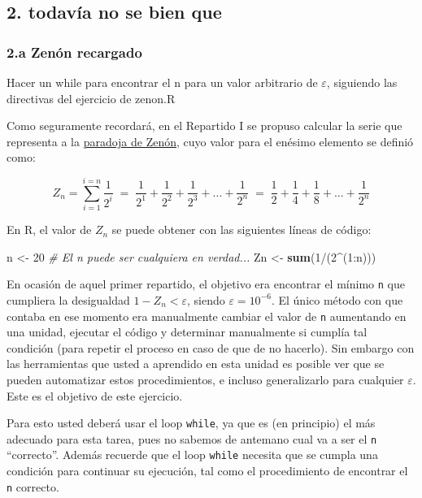\documentclass[]{article}
\newenvironment{Shaded}{}{}
\newcommand{\KeywordTok}[1]{\textcolor[rgb]{0.00,0.44,0.13}{\textbf{{#1}}}}
\newcommand{\DecValTok}[1]{\textcolor[rgb]{0.25,0.63,0.44}{{#1}}}
\newcommand{\CommentTok}[1]{\textcolor[rgb]{0.38,0.63,0.69}{\textit{{#1}}}}
\newcommand{\NormalTok}[1]{{#1}}
\begin{document}
\subsection{2. todavía no se bien que}

\subsubsection{2.a Zenón recargado}

Hacer un while para encontrar el n para un valor arbitrario de
$\varepsilon$, siguiendo las directivas del ejercicio de zenon.R

Como seguramente recordará, en el Repartido I se propuso calcular la
serie que representa a la
\href{https://es.wikipedia.org/wiki/Paradojas\_de\_Zen\%C3\%B3n\#La\_dicotom.C3.ADa}{paradoja
de Zenón}, cuyo valor para el enésimo elemento se definió como:

\[
  Z_n = \sum_{i=1}^{i=n} \frac{1}{2 ^ i} \;=\;
  \frac{1}{2 ^ 1} + \frac{1}{2 ^ 2} + \frac{1}{2 ^ 3} + ... + \frac{1}{2 ^ n} \;=\;
  \frac{1}{2} + \frac{1}{4} + \frac{1}{8} + ... + \frac{1}{2 ^ n}
\]

En R, el valor de $Z_n$ se puede obtener con las siguientes líneas de
código:

\begin{Shaded}
\begin{Highlighting}[]
\NormalTok{n <- }\DecValTok{20}  \CommentTok{# El n puede ser cualquiera en verdad...}
\NormalTok{Zn <- }\KeywordTok{sum}\NormalTok{(}\DecValTok{1}\NormalTok{/(}\DecValTok{2}\NormalTok{^(}\DecValTok{1}\NormalTok{:n)))}
\end{Highlighting}
\end{Shaded}
En ocasión de aquel primer repartido, el objetivo era encontrar el
mínimo \texttt{n} que cumpliera la desigualdad $1 - Z_n < \varepsilon$,
siendo $\varepsilon = 10 ^ {-6}$. El único método con que contaba en ese
momento era manualmente cambiar el valor de \texttt{n} aumentando en una
unidad, ejecutar el código y determinar manualmente si cumplía tal
condición (para repetir el proceso en caso de que de no hacerlo). Sin
embargo con las herramientas que usted a aprendido en esta unidad es
posible ver que se pueden automatizar estos procedimientos, e incluso
generalizarlo para cualquier $\varepsilon$. Este es el objetivo de este
ejercicio.

Para esto usted deberá usar el loop \texttt{while}, ya que es (en
principio) el más adecuado para esta tarea, pues no sabemos de antemano
cual va a ser el \texttt{n} ``correcto''. Además recuerde que el loop
\texttt{while} necesita que se cumpla una condición para continuar su
ejecución, tal como el procedimiento de encontrar el \texttt{n}
correcto.
\end{document}
